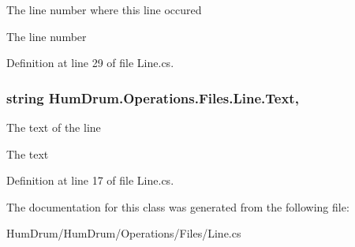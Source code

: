 The line number where this line occured 

The line number

Definition at line 29 of file Line.\+cs.

\subsubsection[{\texorpdfstring{Text}{Text}}]{\setlength{\rightskip}{0pt plus 5cm}string Hum\+Drum.\+Operations.\+Files.\+Line.\+Text\hspace{0.3cm}{\ttfamily [get]}, {\ttfamily [set]}}\hypertarget{classHumDrum_1_1Operations_1_1Files_1_1Line_a885daada20e09b8b049b1804b0b44005}{}\label{classHumDrum_1_1Operations_1_1Files_1_1Line_a885daada20e09b8b049b1804b0b44005}


The text of the line 

The text

Definition at line 17 of file Line.\+cs.



The documentation for this class was generated from the following file\+:\begin{DoxyCompactItemize}
\item 
Hum\+Drum/\+Hum\+Drum/\+Operations/\+Files/Line.\+cs\end{DoxyCompactItemize}
